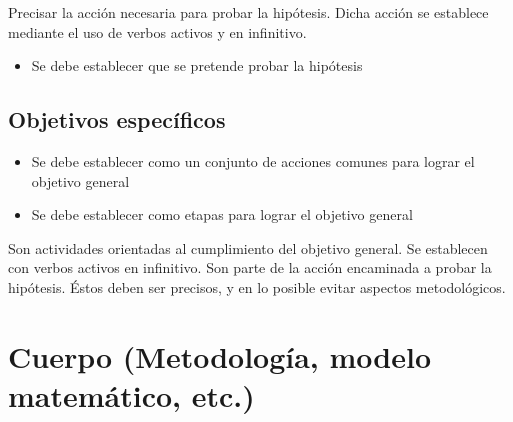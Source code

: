     Precisar la acción necesaria para probar la hipótesis. Dicha acción se establece mediante el uso de verbos activos y en infinitivo.
    \begin{itemize}
        \item Se debe establecer que se pretende probar la hipótesis
    \end{itemize}
    
    \subsection{Objetivos específicos }
    
    \begin{itemize}
        \item Se debe establecer como un conjunto de acciones comunes para lograr el objetivo general
        \item Se debe establecer como etapas para lograr el objetivo general
    \end{itemize}
    
    Son actividades orientadas al cumplimiento del objetivo general. Se establecen con verbos activos en infinitivo. Son parte de la acción encaminada a probar la hipótesis. Éstos deben ser precisos, y en lo posible evitar aspectos metodológicos.
    \section{Cuerpo (Metodología, modelo matemático, etc.)}
    
